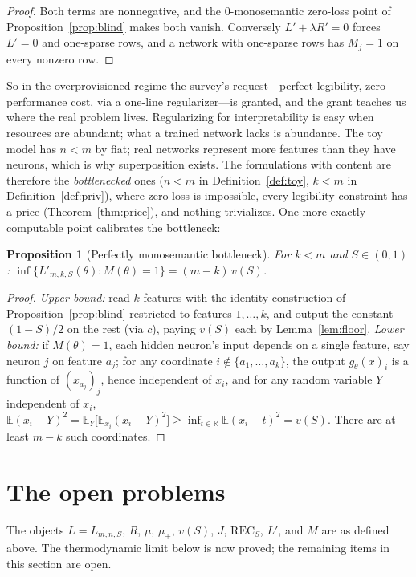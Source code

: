 \documentclass[11pt]{amsart}
\theoremstyle{plain}
\newtheorem{proposition}[theorem]{Proposition}
\theoremstyle{definition}
\newcommand{\E}{\mathbb{E}}
\newcommand{\R}{\mathbb{R}}
\begin{document}
\begin{proof}
Both terms are nonnegative, and the $0$-monosemantic zero-loss point of Proposition~\ref{prop:blind} makes both vanish. Conversely $L'+\lambda R'=0$ forces $L'=0$ and one-sparse rows, and a network with one-sparse rows has $M_j=1$ on every nonzero row.
\end{proof}

So in the overprovisioned regime the survey's request---perfect legibility, zero performance cost, via a one-line regularizer---is granted, and the grant teaches us where the real problem lives. Regularizing for interpretability is easy when resources are abundant; what a trained network lacks is abundance. The toy model has $n<m$ by fiat; real networks represent more features than they have neurons, which is why superposition exists. The formulations with content are therefore the \emph{bottlenecked} ones ($n<m$ in Definition~\ref{def:toy}, $k<m$ in Definition~\ref{def:priv}), where zero loss is impossible, every legibility constraint has a price (Theorem~\ref{thm:price}), and nothing trivializes. One more exactly computable point calibrates the bottleneck:

\begin{proposition}[Perfectly monosemantic bottleneck]\label{prop:monobottleneck}
For $k<m$ and $S\in(0,1)$: $\inf\{L'_{m,k,S}(\theta) : M(\theta)=1\} = (m-k)\,v(S)$.
\end{proposition}

\begin{proof}
\emph{Upper bound:} read $k$ features with the identity construction of Proposition~\ref{prop:blind} restricted to features $1,\dots,k$, and output the constant $(1-S)/2$ on the rest (via $c$), paying $v(S)$ each by Lemma~\ref{lem:floor}. \emph{Lower bound:} if $M(\theta)=1$, each hidden neuron's input depends on a single feature, say neuron $j$ on feature $a_j$; for any coordinate $i\notin\{a_1,\dots,a_k\}$, the output $g_\theta(x)_i$ is a function of $(x_{a_j})_j$, hence independent of $x_i$, and for any random variable $Y$ independent of $x_i$, $\E(x_i-Y)^2 = \E_Y\bigl[\E_{x_i}(x_i-Y)^2\bigr] \ge \inf_{t\in\R}\E(x_i-t)^2 = v(S)$. There are at least $m-k$ such coordinates.
\end{proof}

\section{The open problems}\label{sec:problems}

The objects $L=L_{m,n,S}$, $R$, $\mu$, $\mu_+$, $v(S)$, $J$, $\mathrm{REC}_S$, $L'$, and $M$ are as defined above. The thermodynamic limit below is now proved; the remaining items in this section are open.
\end{document}

